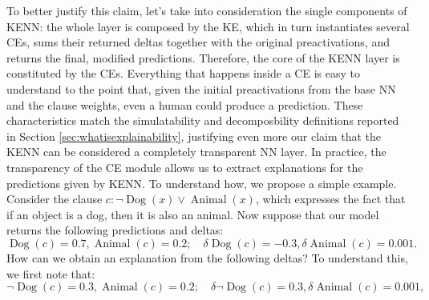  To better justify this claim, let's take into consideration the single components of KENN: the whole layer is composed by the KE, which in turn instantiates several CEs, sums their returned deltas together with the original preactivations, and returns the final, modified predictions. Therefore, the core of the KENN layer is constituted by the CEs. Everything that happens inside a CE is easy to understand to the point that, given the initial preactivations from the base NN and the clause weights, even a human could produce a prediction. These characteristics match the simulatability and decomposbility definitions reported in Section \ref{sec:whatisexplainability}, justifying even more our claim that the KENN can be considered a completely transparent NN layer. In practice, the transparency of the CE module allows us to extract explanations for the predictions given by KENN. To understand how, we propose a simple example. Consider the clause $c : \neg \operatorname{Dog}(x) \vee \operatorname{Animal}(x)$, which expresses the fact that if an object is a dog, then it is also an animal. Now suppose that our model returns the following predictions and deltas:
 $$\operatorname{Dog}(c)=0.7, \operatorname{Animal}(c)=0.2; \quad \delta \operatorname{Dog}(c)=-0.3, \delta \operatorname{Animal}(c)=0.001.$$
 How can we obtain an explanation from the following deltas? To understand this, we first note that:
  $$\neg \operatorname{Dog}(c)=0.3, \operatorname{Animal}(c)=0.2; \quad \delta \neg \operatorname{Dog}(c)=0.3, \delta \operatorname{Animal}(c)=0.001,$$
